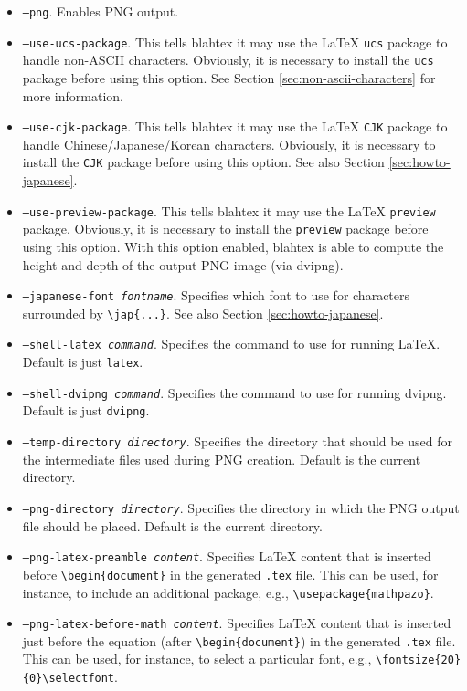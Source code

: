 \documentclass{article}
\newcommand{\texcommand}[1]{\textbackslash{}#1}
\begin{document}
\begin{itemize}
\item \texttt{--png}. Enables PNG output.
\item \texttt{--use-ucs-package}. This tells blahtex it may use the \LaTeX{} \texttt{ucs} package to handle non-ASCII characters. Obviously, it is necessary to install the \texttt{ucs} package before using this option. See Section \ref{sec:non-ascii-characters} for more information.
\item \texttt{--use-cjk-package}. This tells blahtex it may use the \LaTeX{} \texttt{CJK} package to handle Chinese/Japanese/Korean characters. Obviously, it is necessary to install the \texttt{CJK} package before using this option. See also Section \ref{sec:howto-japanese}.
\item \texttt{--use-preview-package}. This tells blahtex it may use the \LaTeX{} \texttt{preview} package. Obviously, it is necessary to install the \texttt{preview} package before using this option. With this option enabled, blahtex is able to compute the height and depth of the output PNG image (via dvipng).
\item \texttt{--japanese-font \textit{fontname}}. Specifies which font to use for characters surrounded by \texttt{\texcommand{jap}\{...\}}. See also Section \ref{sec:howto-japanese}.
\item \texttt{--shell-latex \textit{command}}. Specifies the command to use for running \LaTeX{}. Default is just \texttt{latex}.
\item \texttt{--shell-dvipng \textit{command}}. Specifies the command to use for running dvipng. Default is just \texttt{dvipng}.
\item \texttt{--temp-directory \textit{directory}}. Specifies the directory that should be used for the intermediate files used during PNG creation. Default is the current directory.
\item \texttt{--png-directory \textit{directory}}. Specifies the directory in which the PNG output file should be placed. Default is the current directory.
\item \texttt{--png-latex-preamble \textit{content}}. Specifies LaTeX content that is inserted before \verb|\begin{document}| in the generated \texttt{.tex} file. This can be used, for instance, to include an additional package, e.g., \verb|\usepackage{mathpazo}|.
\item \texttt{--png-latex-before-math \textit{content}}. Specifies LaTeX content that is inserted just before the equation (after \verb|\begin{document}|) in the generated \texttt{.tex} file. This can be used, for instance, to select a particular font, e.g., \verb|\fontsize{20}{0}\selectfont|.
\end{itemize}
\end{document}
